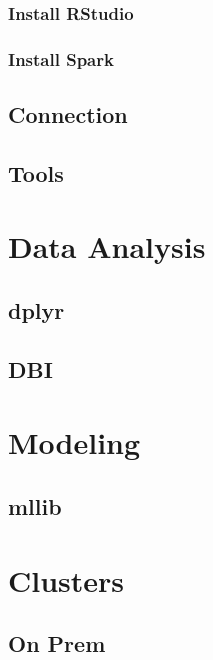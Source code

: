 \documentclass[]{book}
\theoremstyle{definition}
\theoremstyle{definition}
\theoremstyle{definition}
\theoremstyle{remark}
\begin{document}
\subsection{Install RStudio}\label{install-rstudio}

\subsection{Install Spark}\label{install-spark}

\section{Connection}\label{connection}

\section{Tools}\label{tools}

\chapter{Data Analysis}\label{dplyr}

\section{dplyr}\label{dplyr}

\section{DBI}\label{dbi}

\chapter{Modeling}\label{modeling}

\section{mllib}\label{mllib}

\chapter{Clusters}\label{clusters}

\section{On Prem}\label{on-prem}
\end{document}
